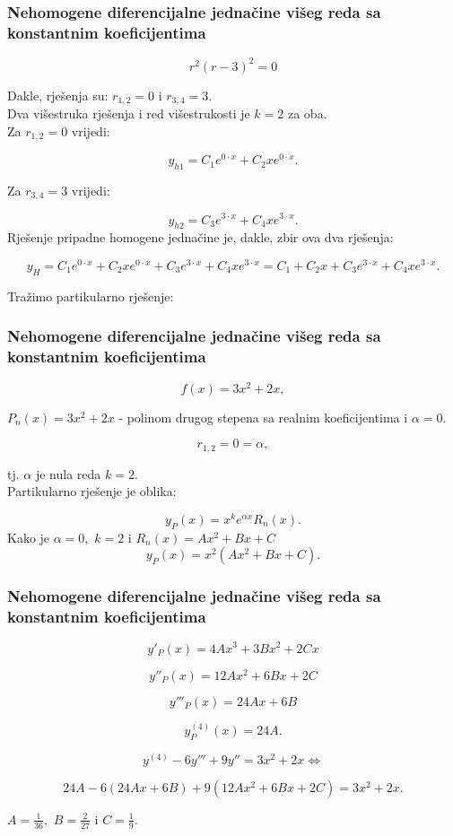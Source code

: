 \documentclass{beamer}
\begin{document}
\begin{frame}
\frametitle{Nehomogene diferencijalne jednačine višeg reda sa konstantnim koeficijentima} 
$$r^{2} (r-3)^{2} = 0$$

Dakle, rješenja su: $r_{1,2} = 0$ i $r_{3,4} = 3.$\\

 Dva višestruka rješenja i red višestrukosti je $k=2$ za oba.\\
 
 Za  $r_{1,2} = 0$  vrijedi:
 
$$y_{h1} = C_{1}e^{0 \cdot x} + C_{2}xe^{0\cdot x}  .$$

Za $r_{3,4} = 3$  vrijedi:

$$y_{h2} = C_{3}e^{3 \cdot x} + C_{4}xe^{3\cdot x}  .$$
Rješenje pripadne homogene jednačine je, dakle, zbir ova dva rješenja:

$$y_{H} = C_{1}e^{0 \cdot x} + C_{2}xe^{0\cdot x} + C_{3}e^{3 \cdot x} + C_{4}xe^{3\cdot x} = C_{1} + C_{2}x + C_{3}e^{3 \cdot x} + C_{4}xe^{3\cdot x}  .$$

Tražimo partikularno rješenje:

 

\end{frame}
\begin{frame}
\frametitle{Nehomogene diferencijalne jednačine višeg reda sa konstantnim koeficijentima} 
$$f(x) = 3x^{2} + 2x, $$

$P_{n}(x)= 3x^{2} + 2x  $ - polinom drugog stepena sa realnim koeficijentima i $\alpha = 0.$ 

$$r_{1,2} = 0 = \alpha, $$

tj. $ \alpha $ je nula reda $k=2.$\\

Partikularno rješenje je oblika:

$$y_{P}(x) = x^{k}e^{\alpha x}R_{n}(x).$$ 
Kako je $\alpha = 0, $ $k = 2$ i   $R_{n}(x) = Ax^{2} + Bx + C $\\

$$y_{P}(x) = x^{2}(Ax^{2} + Bx + C).$$


 

\end{frame}
\begin{frame}
\frametitle{Nehomogene diferencijalne jednačine višeg reda sa konstantnim koeficijentima} 
$$y'_{P}(x) = 4Ax^{3} + 3Bx^{2} + 2Cx$$

 $$y''_{P}(x) = 12Ax^{2} + 6Bx + 2C$$

 $$y'''_{P}(x) = 24Ax + 6B$$
 
 $$y^{(4)}_{P}(x) = 24A.$$
 
 $$y^{(4)} - 6y''' + 9y'' = 3x^{2} + 2x \Longleftrightarrow$$
 
 $$24A - 6( 24Ax + 6B)+ 9(12Ax^{2} + 6Bx + 2C) = 3x^{2} + 2x.$$
 
 $A = \frac{1}{36}, $ $B = \frac{2}{27}$  i $C = \frac{1}{9}.$


 




\end{frame}
\end{document}
